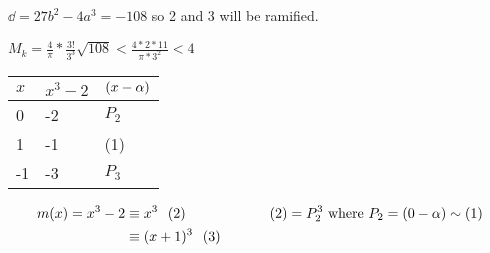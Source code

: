 \documentclass[11pt]{article}
\begin{document}
$\dd = 27b^2 - 4a^3 = -108 $ so 2 and 3 will be ramified.
\spa

$M_k = \frac4\pi * \frac{3!}{3^3} \sqrt{108} < \frac{4*2*11}{\pi *3^2} < 4$
\spac

\begin{tabular}{l|l|l}
	$x$ & $x^3 - 2$ & $(x-\alpha)$ \\ \hline
	0   & -2        & $P_2$    \\
	1   & -1        & (1)      \\
	-1  & -3        & $P_3$   
\end{tabular}

\begin{align*}
	m(x) = x^3 - 2 &\equiv x^3 \hspace{7pt} (2) \hspace{50pt} & (2) &= P_2^3 \text{ where } P_2 = (0 - \alpha) \sim (1) \\
	&\equiv (x+1)^3 \hspace{7pt} (3) 
\end{align*}







 
\end{document}
